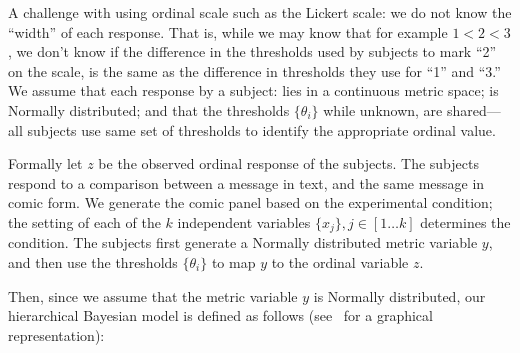 A challenge with using ordinal scale such as the Lickert scale: we do not know the ``width'' of each response. That is, while we may know that for example $1<2<3$, we don't know if the difference in the thresholds used by subjects to mark ``2'' on the scale, is the same as the difference in thresholds they use for ``1'' and ``3.''  We assume that each response by a subject: lies in a continuous metric space; is Normally distributed; and that the thresholds $\{\theta_i\}$ while unknown, are shared---all subjects use same set of thresholds to identify the appropriate ordinal value.

Formally let $z$ be the observed ordinal response of the subjects. The subjects respond to a comparison between a message in text, and the same message in comic form. We generate the comic panel based on the experimental condition; 
the setting of each of the $k$ independent variables $\{x_j\}, j \in [1 \ldots k]$ determines the condition. The subjects first generate a Normally distributed metric variable $y$, and then use the thresholds $\{\theta_i\}$ to map $y$ to the ordinal variable $z$.

Then, since we assume that the metric variable $y$ is Normally distributed, our hierarchical Bayesian model is defined as follows (see~ for a graphical representation):


